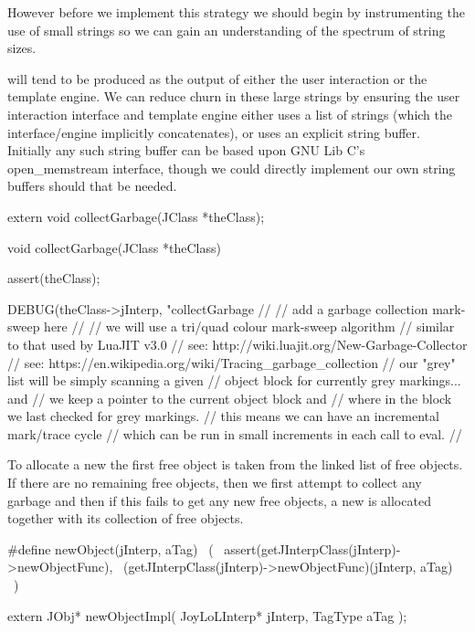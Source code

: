 However before we implement this strategy we should begin by instrumenting 
the use of small strings so we can gain an understanding of the spectrum of 
string sizes. 

 will tend to be produced as the output of either the 
user interaction or the template engine. We can reduce churn in these 
large strings by ensuring the user interaction interface and template 
engine either uses a list of strings (which the interface/engine 
implicitly concatenates), or uses an explicit string buffer. Initially any 
such string buffer can be based upon GNU Lib C's open_memstream interface, 
though we could directly implement our own string buffers should that be 
needed. 

\startCHeader
extern void collectGarbage(JClass *theClass);
\stopCHeader
{}

\startCCode
void collectGarbage(JClass *theClass) {
  assert(theClass);
  
  DEBUG(theClass->jInterp, "collectGarbage %
  //
  // add a garbage collection mark-sweep here
  //
  // we will use a tri/quad colour mark-sweep algorithm
  // similar to that used by LuaJIT v3.0
  // see: http://wiki.luajit.org/New-Garbage-Collector
  // see: https://en.wikipedia.org/wiki/Tracing_garbage_collection
  // our "grey" list will be simply scanning a given 
  // object block for currently grey markings... and
  // we keep a pointer to the current object block and
  // where in the block we last checked for grey markings.
  // this means we can have an incremental mark/trace cycle
  // which can be run in small increments in each call to eval.
  //
}
\stopCCode

\startTestSuite[newObject]

To allocate a new  the first free object is taken from 
the linked list of free objects. If there are no remaining free objects, 
then we first attempt to collect any garbage and then if this fails to get 
any new free objects, a new  is allocated together with 
its collection of free objects. 

\startCHeader
#define newObject(jInterp, aTag)                              \
  (                                                           \
    assert(getJInterpClass(jInterp)->newObjectFunc),          \
    (getJInterpClass(jInterp)->newObjectFunc)(jInterp, aTag)  \
  )
\stopCHeader

\setCHeaderStream{private}
\startCHeader
extern JObj* newObjectImpl(
  JoyLoLInterp* jInterp,
  TagType aTag
);
\stopCHeader
{}

